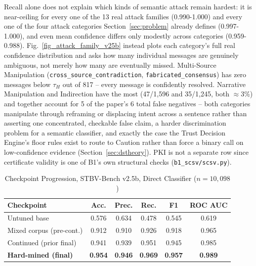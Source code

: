 \documentclass[conference]{IEEEtran}
\begin{document}
Recall alone does not explain which kinds of semantic attack remain hardest: it is near-ceiling for every one of the 13 real attack families (0.990-1.000) and every one of the four attack categories Section~\ref{sec:problem} already defines (0.997-1.000), and even mean confidence differs only modestly across categories (0.959-0.988). Fig.~\ref{fig_attack_family_v25b} instead plots each category's full real confidence distribution and asks how many individual messages are genuinely ambiguous, not merely how many are eventually missed. Multi-Source Manipulation (\texttt{cross\_source\_contradiction}, \texttt{fabricated\_consensus}) has zero messages below $\tau_H$ out of 817 -- every message is confidently resolved. Narrative Manipulation and Indirection have the most (47/1,596 and 35/1,245, both $\approx$3\%) and together account for 5 of the paper's 6 total false negatives -- both categories manipulate through reframing or displacing intent across a sentence rather than asserting one concentrated, checkable false claim, a harder discrimination problem for a semantic classifier, and exactly the case the Trust Decision Engine's floor rules exist to route to Caution rather than force a binary call on low-confidence evidence (Section~\ref{sec:dstheory}). PKI is not a separate row since certificate validity is one of B1's own structural checks (\texttt{b1\_scsv/scsv.py}).

\begin{table}[t]
\centering
\caption{Checkpoint Progression, STBV-Bench v2.5b, Direct Classifier ($n{=}10{,}098$)}
\label{tab:v25b}
\footnotesize
\begin{tabular}{@{}lccccc@{}}
\toprule
Checkpoint & Acc. & Prec. & Rec. & F1 & ROC AUC \\
\midrule
Untuned base & 0.576 & 0.634 & 0.478 & 0.545 & 0.619 \\
Mixed corpus (pre-cont.) & 0.912 & 0.910 & 0.926 & 0.918 & 0.965 \\
Continued (prior final) & 0.941 & 0.939 & 0.951 & 0.945 & 0.985 \\
\textbf{Hard-mined (final)} & \textbf{0.954} & \textbf{0.946} & \textbf{0.969} & \textbf{0.957} & \textbf{0.989} \\
\bottomrule
\end{tabular}
\end{table}
\end{document}
